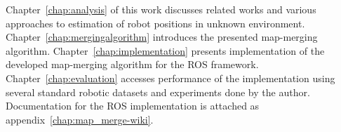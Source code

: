 Chapter~\ref{chap:analysis} of this work discusses related works and various approaches to estimation of robot positions in unknown environment. Chapter~\ref{chap:mergingalgorithm} introduces the presented map-merging algorithm. Chapter~\ref{chap:implementation} presents implementation of the developed map-merging algorithm for the \gls{ROS} framework. Chapter~\ref{chap:evaluation} accesses performance of the implementation using several standard robotic datasets and experiments done by the author. Documentation for the \gls{ROS} implementation is attached as appendix~\ref{chap:map_merge-wiki}.
